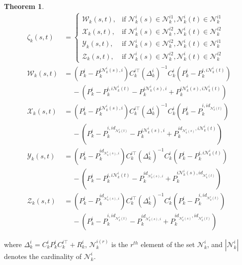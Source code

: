 \documentclass[twocolumn]{IEEEtran}
\newtheorem{theorem}{Theorem}
\begin{document}
\begin{theorem}
\begin{equation*}
\end{equation*}
\begin{equation*}
\begin{split}
\zeta_{k}(s,t)&= \left\{\begin{array}{cl}
\mathcal{W}_{k}(s,t), &\text{if $\mathcal{N}_{k}^{i}(s)\in \mathcal{N}_{k}^{i1},\mathcal{N}_{k}^{i}(t)\in \mathcal{N}_{k}^{i1}$}\\
\mathcal{X}_{k}(s,t), &\text{if $\mathcal{N}_{k}^{i}(s)\in \mathcal{N}_{k}^{i2},\mathcal{N}_{k}^{i}(t)\in \mathcal{N}_{k}^{i2}$}\\
\mathcal{Y}_{k}(s,t), &\text{if $\mathcal{N}_{k}^{i}(s)\in \mathcal{N}_{k}^{i2},\mathcal{N}_{k}^{i}(t)\in \mathcal{N}_{k}^{i1}$}\\
\mathcal{Z}_{k}(s,t), &\text{if $\mathcal{N}_{k}^{i}(s)\in \mathcal{N}_{k}^{i2},\mathcal{N}_{k}^{i}(t)\in \mathcal{N}_{k}^{i2}$}
\end{array}\right.\\
\mathcal{W}_{k}(s,t)&=(P_{k}^i-P_{k}^{i\mathcal{N}_{k}^{i}(s),i}) C_{k}^{i\top} (\Delta_{k}^i)^{-1} C_{k}^i(P_{k}^i-P_{k}^{i,i\mathcal{N}_{k}^{i}(t)})\\
&\quad~- (P_{k}^{i}- P_{k}^{i,i\mathcal{N}_{k}^{i}(t)} -P_{k}^{i\mathcal{N}_{k}^{i}(s),i} + P_{k}^{i\mathcal{N}_{k}^{i}(s),i\mathcal{N}_{k}^{i}(t)})\\
\mathcal{X}_{k}(s,t)&=(P_{k}^i-P_{k}^{i\mathcal{N}_{k}^{i}(s),i}) C_{k}^{i\top} (\Delta_{k}^i)^{-1} C_{k}^i(P_{k}^i-P_{k}^{i,id_{\mathcal{N}_{k}^{i}(t)}})\\
&\quad~- (P_{k}^{i} -P_{k}^{i,id_{\mathcal{N}_{k}^{i}(t)}}-P_{k}^{i\mathcal{N}_{k}^{i}(s),i}+ P_{k}^{id_{\mathcal{N}_{k}^{i}(s)},i\mathcal{N}_{k}^{i}(t)})\\ 
\mathcal{Y}_{k}(s,t)&=(P_{k}^i-P_{k}^{id_{\mathcal{N}_{k}^{i}(s),i}}) C_{k}^{i\top} (\Delta_{k}^i)^{-1} C_{k}^i(P_{k}^i-P_{k}^{i,i\mathcal{N}_{k}^{i}(t)})\\
&\quad~- (P_{k}^{i} - P_{k}^{i,i\mathcal{N}_{k}^{i}(t)}-P_{k}^{id_{\mathcal{N}_{k}^{i}(s),i}} + P_{k}^{i{\mathcal{N}_{k}^{i}(s)},id_{\mathcal{N}_{k}^{i}(t)}})\\ 
\mathcal{Z}_{k}(s,t)&=(P_{k}^i-P_{k}^{id_{\mathcal{N}_{k}^{i}(s),i}}) C_{k}^{i\top} (\Delta_{k}^i)^{-1} C_{k}^i(P_{k}^i-P_{k}^{i,id_{\mathcal{N}_{k}^{i}(t)}})\\
&\quad~- (P_{k}^{i} - P_{k}^{i,id_{\mathcal{N}_{k}^{i}(t)}}-P_{k}^{id_{\mathcal{N}_{k}^{i}(s),i}} + P_{k}^{id_{\mathcal{N}_{k}^{i}(s)},id_{\mathcal{N}_{k}^{i}(t)}})
\end{split}
\end{equation*}
\end{theorem}
where $\Delta_{k}^i=C_{k}^iP_{k}^iC_{k}^{i\top}+R_{k}^i$, $\mathcal{N}_{k}^{i(r)}$ is the $r^{th}$ element of the set $\mathcal{N}_{k}^{i}$, and $|\mathcal{N}_{k}^{i}|$ denotes the cardinality of $\mathcal{N}_{k}^{i}$.
\end{document}
